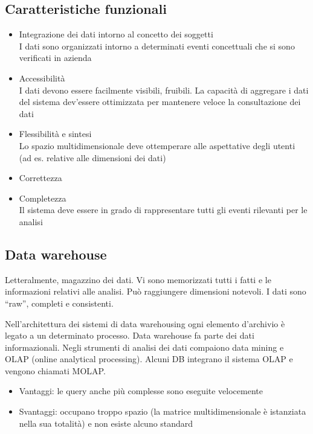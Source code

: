 \subsection{Caratteristiche
funzionali}\label{caratteristiche-funzionali}

\begin{itemize}

\item
  Integrazione dei dati intorno al concetto dei soggetti\\
  I dati sono organizzati intorno a determinati eventi concettuali che
  si sono verificati in azienda
\item
  Accessibilit\`a\\
  I dati devono essere facilmente visibili, fruibili. La capacit\`a di
  aggregare i dati del sistema dev'essere ottimizzata per mantenere
  veloce la consultazione dei dati
\item
  Flessibilit\`a e sintesi\\
  Lo spazio multidimensionale deve ottemperare alle aspettative degli
  utenti (ad es. relative alle dimensioni dei dati)
\item
  Correttezza
\item
  Completezza\\
  Il sistema deve essere in grado di rappresentare tutti gli eventi
  rilevanti per le analisi
\end{itemize}

\subsection{Data warehouse}\label{data-warehouse}

Letteralmente, magazzino dei dati. Vi sono memorizzati tutti i fatti e
le informazioni relativi alle analisi. Pu\`o raggiungere dimensioni
notevoli. I dati sono ``raw'', completi e consistenti.

Nell'architettura dei sistemi di data warehousing ogni elemento
d'archivio \`e legato a un determinato processo. Data warehouse fa parte
dei dati informazionali. Negli strumenti di analisi dei dati compaiono
data mining e OLAP (online analytical processing). Alcuni DB integrano
il sistema OLAP e vengono chiamati MOLAP.

\begin{itemize}

\item
  Vantaggi: le query anche pi\`u complesse sono eseguite velocemente
\item
  Svantaggi: occupano troppo spazio (la matrice multidimensionale \`e
  istanziata nella sua totalit\`a) e non esiste alcuno standard
\end{itemize}

